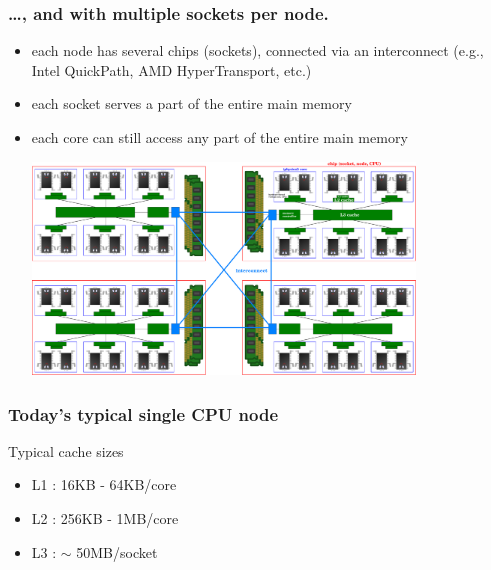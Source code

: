 \documentclass[12pt,dvipdfmx]{beamer}
\begin{document}
\begin{frame}
\frametitle{\ldots, and with multiple sockets per node.}
\begin{itemize}
\item each node has several chips (sockets), connected via an
interconnect (e.g., Intel QuickPath, AMD HyperTransport, etc.)
\item each socket serves a part of the entire main memory
\item each core can still access any part of the entire main memory

\begin{center}
\includegraphics[width=0.8\textwidth]{out/pdf/svg/diagram_multisocket.pdf}
\end{center}
\end{itemize}
\end{frame}


\begin{frame}
\frametitle{Today's typical single CPU node}
\begin{center}
\def\svgwidth{0.6\textwidth}
{\footnotesize}
\end{center}

Typical cache sizes
\begin{itemize}
\item L1 : 16KB - 64KB/core
\item L2 : 256KB - 1MB/core
\item L3 : $\sim$ 50MB/socket
\end{itemize}

\end{frame}
\end{document}
